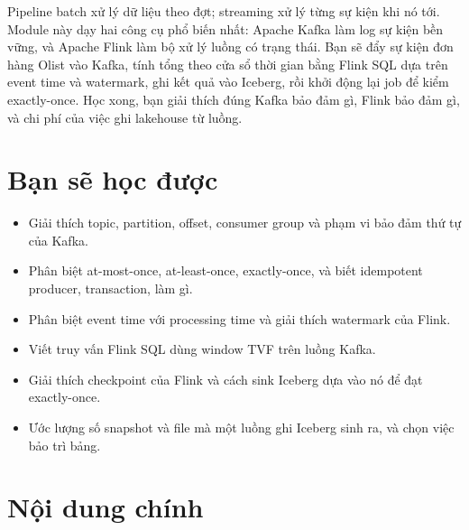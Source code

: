 
Pipeline batch xử lý dữ liệu theo đợt; streaming xử lý từng sự kiện khi nó tới. Module này dạy hai công cụ phổ biến nhất: Apache Kafka làm log sự kiện bền vững, và Apache Flink làm bộ xử lý luồng có trạng thái. Bạn sẽ đẩy sự kiện đơn hàng Olist vào Kafka, tính tổng theo cửa sổ thời gian bằng Flink SQL dựa trên event time và watermark, ghi kết quả vào Iceberg, rồi khởi động lại job để kiểm exactly-once. Học xong, bạn giải thích đúng Kafka bảo đảm gì, Flink bảo đảm gì, và chi phí của việc ghi lakehouse từ luồng.

\section{Bạn sẽ học được}
\begin{itemize}
  \item Giải thích topic, partition, offset, consumer group và phạm vi bảo đảm thứ tự của Kafka.
  \item Phân biệt at-most-once, at-least-once, exactly-once, và biết idempotent producer, transaction,  làm gì.
  \item Phân biệt event time với processing time và giải thích watermark của Flink.
  \item Viết truy vấn Flink SQL dùng window TVF trên luồng Kafka.
  \item Giải thích checkpoint của Flink và cách sink Iceberg dựa vào nó để đạt exactly-once.
  \item Ước lượng số snapshot và file mà một luồng ghi Iceberg sinh ra, và chọn việc bảo trì bảng.
\end{itemize}

\section{Nội dung chính}

